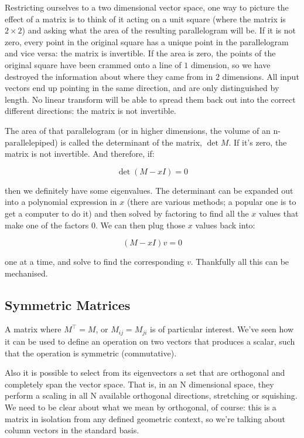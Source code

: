 Restricting ourselves to a two dimensional vector space, one way to picture the effect of a matrix is to think of it acting on a unit square (where the matrix is $2 \times 2$) and asking what the area of the resulting parallelogram will be. If it is not zero, every point in the original square has a unique point in the parallelogram and vice versa: the matrix is invertible. If the area is zero, the points of the original square have been crammed onto a line of $1$ dimension, so we have destroyed the information about where they came from in $2$ dimensions. All input vectors end up pointing in the same direction, and are only distinguished by length. No linear transform will be able to spread them back out into the correct different directions: the matrix is not invertible.

The area of that parallelogram (or in higher dimensions, the volume of an n-parallelepiped) is called the determinant of the matrix, $\det M$. If it's zero, the matrix is not invertible. And therefore, if:

$$\det{(M - xI)} = 0$$

then we definitely have some eigenvalues. The determinant can be expanded out into a polynomial expression in $x$ (there are various methods; a popular one is to get a computer to do it) and then solved by factoring to find all the $x$ values that make one of the factors $0$. We can then plug those $x$ values back into:

$$(M - xI)v = 0$$

one at a time, and solve to find the corresponding $v$. Thankfully all this can be mechanised.

\subsection{Symmetric Matrices}\label{ch:vectors-symmetric}

A matrix where $M^\intercal = M$, or $M_{ij} = M_{ji}$ is of particular interest. We've seen how it can be used to define an operation on two vectors that produces a scalar, such that the operation is symmetric (commutative).

Also it is possible to select from its eigenvectors a set that are orthogonal and completely span the vector space. That is, in an N dimensional space, they perform a scaling in all N available orthogonal directions, stretching or squishing. We need to be clear about what we mean by orthogonal, of course: this is a matrix in isolation from any defined geometric context, so we're talking about column vectors in the standard basis.

